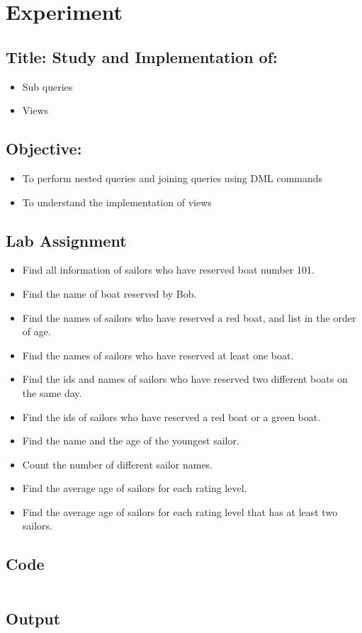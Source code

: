 \documentclass{article}
\begin{document}
\section*{Experiment \jobname}
\subsection*{\textbf{Title:} Study and Implementation of:}
\begin{itemize}
	\item Sub queries
	\item Views
\end{itemize}
\subsection*{\textbf{Objective:}}
\begin{itemize}
	\item To perform nested queries and joining queries using DML commands
	\item To understand the implementation of views
\end{itemize}
\subsection*{Lab Assignment}
\begin{itemize}
	\item Find all information of sailors who have reserved boat number 101.
	\item Find the name of boat reserved by Bob.
	\item Find the names of sailors who have reserved a red boat, and list in the order of age.
	\item Find the names of sailors who have reserved at least one boat.
	\item Find the ids and names of sailors who have reserved two different boats on the same day.
	\item Find the ids of sailors who have reserved a red boat or a green boat.
	\item Find the name and the age of the youngest sailor.
	\item Count the number of different sailor names.
	\item Find the average age of sailors for each rating level.
	\item Find the average age of sailors for each rating level that has at least two sailors.
\end{itemize}
\subsection*{Code}
\inputminted{sql}{code/\jobname.sql}
\subsection*{Output}

\end{document}
